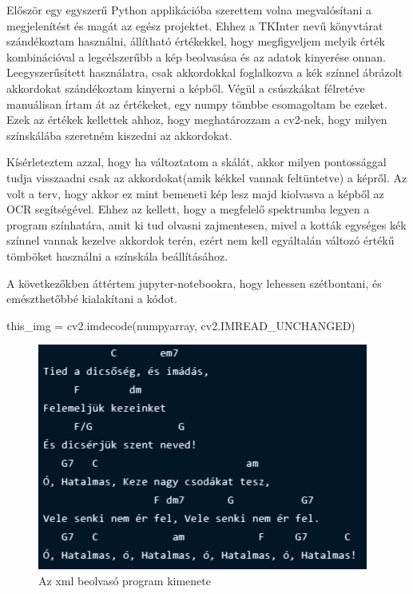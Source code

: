 
Először egy egyszerű Python applikációba szerettem volna megvalósítani a megjelenítést és magát az egész projektet. Ehhez a TKInter nevű könyvtárat szándékoztam használni, állítható értékekkel, hogy megfigyeljem melyik érték kombinációval a legcélszerűbb a kép beolvasása és az adatok kinyerése onnan. Leegyszerűsített használatra, csak akkordokkal foglalkozva a kék színnel ábrázolt akkordokat szándékoztam kinyerni a képből. Végül a csúszkákat félretéve manuálisan írtam át az értékeket, egy numpy tömbbe csomagoltam be ezeket. Ezek az értékek kellettek ahhoz, hogy meghatározzam a cv2-nek, hogy milyen színskálába szeretném kiszedni az akkordokat. 
\par
Kísérleteztem azzal, hogy ha változtatom a skálát, akkor milyen pontossággal tudja visszaadni csak az akkordokat(amik kékkel vannak feltüntetve) a képről. Az volt a terv, hogy akkor ez mint bemeneti kép lesz majd kiolvasva a képből az OCR segítségével. Ehhez az kellett, hogy a megfelelő spektrumba legyen a program színhatára, amit ki tud olvasni zajmentesen, mivel a kották egységes kék színnel vannak kezelve akkordok terén, ezért nem kell egyáltalán változó értékű tömböket használni a színskála beállításához.
\par

A következőkben áttértem jupyter-notebookra, hogy lehessen szétbontani, és emészthetőbbé kialakítani a kódot.

\begin{python}
this_img = cv2.imdecode(numpyarray, cv2.IMREAD_UNCHANGED)	
\end{python}

\begin{figure}[h]
	\includegraphics[scale=1]{images/output_tied.png}
	\caption{Az xml beolvasó program kimenete}
	\label{fig:output1}
\end{figure}

